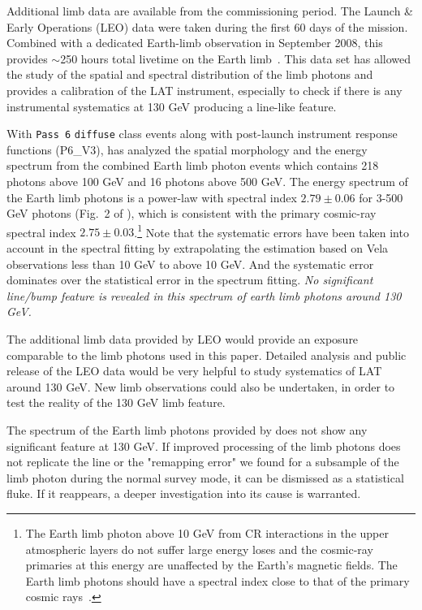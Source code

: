 \documentclass[aps,twocolumn,prd,superscriptaddress,showpacs,nofootinbib,fixfloat]{revtex4}
\begin{document}
Additional limb data are available from the commissioning period.  The
Launch \& Early Operations (LEO) data were taken during the first 60 days of
the mission. Combined with a dedicated Earth-limb observation in September
2008, this
provides $\sim$250 hours total livetime on the Earth limb~\cite{FermiLimb}. 
This data set has allowed the study of the spatial
and spectral distribution of the limb photons and provides a calibration of the
LAT instrument, especially to check if there is any instrumental systematics
at 130 GeV producing a line-like feature.

With \texttt{Pass 6} \texttt{diffuse} class events along with
post-launch instrument response functions (P6\_V3),
\cite{FermiLimb} has analyzed the spatial morphology and the
energy spectrum from the combined Earth limb photon events
which contains 218 photons above 100 GeV and 16 photons
above 500 GeV. The energy spectrum of the Earth limb photons
is a power-law with spectral index $2.79\pm
0.06$ for 3-500 GeV photons (Fig.~2 of \cite{FermiLimb}),
which is consistent with the primary cosmic-ray spectral
index $2.75\pm 0.03$.\footnote{The Earth limb photon above 10
  GeV from CR interactions in the upper atmospheric
  layers do not suffer large energy loses and the cosmic-ray
  primaries at this energy are unaffected by the Earth's
  magnetic fields. The Earth limb photons should have a
  spectral index close to that of the primary cosmic
  rays~\cite{FermiLimb}. } Note that the systematic errors
have been taken into account in the spectral fitting by
extrapolating the estimation based on Vela observations less
than 10 GeV to above 10 GeV. And the systematic error
dominates over the statistical error in the spectrum
fitting. \emph{No significant line/bump feature is revealed
  in this spectrum of earth limb photons around 130 GeV.}

The additional limb data provided by LEO would provide an exposure comparable
to the limb photons used in this paper. Detailed analysis and public release
of the LEO data would be very helpful to study systematics of LAT around 130
GeV.  New limb observations could also be undertaken, in order to test the
reality of the 130 GeV limb feature.

The spectrum of the Earth limb photons provided by
\citep{FermiLimb} does not show any significant feature at
130 GeV. If improved processing of the limb photons does not
replicate the line or the "remapping error" we found for a
subsample of the limb photon during the normal survey mode,
it can be dismissed as a statistical fluke.  If it
reappears, a deeper investigation into its cause is
warranted.
\end{document}
